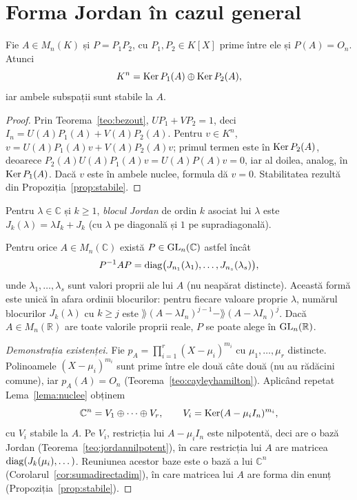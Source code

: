 \section{Forma Jordan în cazul general}

\begin{lema}\label{lema:nuclee}
Fie $A\in M_n(K)$ și $P=P_1P_2$, cu $P_1,P_2\in K[X]$ prime între ele și $P(A)=O_n$. Atunci
\[
K^n=\operatorname{Ker} P_1(A)\oplus\operatorname{Ker} P_2(A),
\]
iar ambele subspații sunt stabile la $A$.
\end{lema}

\begin{proof}
Prin Teorema~\ref{teo:bezout}, $UP_1+VP_2=1$, deci $I_n=U(A)P_1(A)+V(A)P_2(A)$. Pentru $v\in K^n$, $v=U(A)P_1(A)v+V(A)P_2(A)v$; primul termen este în $\operatorname{Ker} P_2(A)$, deoarece $P_2(A)U(A)P_1(A)v=U(A)P(A)v=0$, iar al doilea, analog, în $\operatorname{Ker} P_1(A)$. Dacă $v$ este în ambele nuclee, formula dă $v=0$. Stabilitatea rezultă din Propoziția~\ref{prop:stabile}.
\end{proof}

Pentru $\lambda\in\mathbb{C}$ și $k\ge1$, \emph{blocul Jordan} de ordin $k$ asociat lui $\lambda$ este $J_k(\lambda)=\lambda I_k+J_k$ (cu $\lambda$ pe diagonală și $1$ pe supradiagonală).

\begin{teorema}\label{teo:jordan}
Pentru orice $A\in M_n(\mathbb{C})$ există $P\in\mathrm{GL}_n(\mathbb{C})$ astfel încât
\[
P^{-1}AP=\operatorname{diag}\bigl(J_{n_1}(\lambda_1),\dots,J_{n_s}(\lambda_s)\bigr),
\]
unde $\lambda_1,\dots,\lambda_s$ sunt valori proprii ale lui $A$ (nu neapărat distincte). Această formă este unică în afara ordinii blocurilor: pentru fiecare valoare proprie $\lambda$, numărul blocurilor $J_k(\lambda)$ cu $k\ge j$ este $\rang(A-\lambda I_n)^{j-1}-\rang(A-\lambda I_n)^j$. Dacă $A\in M_n(\mathbb{R})$ are toate valorile proprii reale, $P$ se poate alege în $\mathrm{GL}_n(\mathbb{R})$.
\end{teorema}

\begin{proof}[Demonstrația existenței]
Fie $p_A=\prod_{i=1}^r(X-\mu_i)^{m_i}$ cu $\mu_1,\dots,\mu_r$ distincte. Polinoamele $(X-\mu_i)^{m_i}$ sunt prime între ele două câte două (nu au rădăcini comune), iar $p_A(A)=O_n$ (Teorema~\ref{teo:cayleyhamilton}). Aplicând repetat Lema~\ref{lema:nuclee} obținem
\[
\mathbb{C}^n=V_1\oplus\cdots\oplus V_r,\qquad V_i=\operatorname{Ker}(A-\mu_iI_n)^{m_i},
\]
cu $V_i$ stabile la $A$. Pe $V_i$, restricția lui $A-\mu_iI_n$ este nilpotentă, deci are o bază Jordan (Teorema~\ref{teo:jordannilpotent}), în care restricția lui $A$ are matricea $\operatorname{diag}(J_{k}(\mu_i),\dots)$. Reuniunea acestor baze este o bază a lui $\mathbb{C}^n$ (Corolarul~\ref{cor:sumadirectadim}), în care matricea lui $A$ are forma din enunț (Propoziția~\ref{prop:stabile}).
\end{proof}


